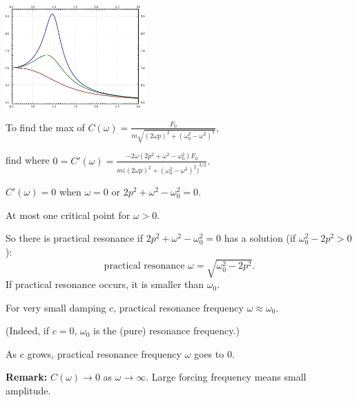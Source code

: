 \documentclass[10pt,aspectratio=169]{beamer}
\begin{document}
\begin{frame}

\hfill
\includegraphics[width=2.1in]{../figures/3-6-pracres}

\vspace*{-1.5in}
To find the max of
\quad
$\displaystyle
C(\omega) =
\frac{F_0}{m \sqrt{{(2\omega p)}^2+{(\omega_0^2-\omega^2)}^2}} ,
$

\medskip

find where
\quad
$\displaystyle
0 =
C'(\omega) =
\frac{- 2\omega( 2p^2+\omega^2-\omega_0^2)F_0}
{m {\bigl({(2\omega p)}^2+{(\omega_0^2-\omega^2)}^2\bigr)}^{3/2}} .
$

\medskip

$C'(\omega) = 0$ when
$\omega = 0$ or
$2p^2+\omega^2-\omega_0^2 = 0$.

\medskip
\pause

At most one critical point for $\omega > 0$.

\medskip
\pause

So there is practical resonance if $2p^2+\omega^2-\omega_0^2 = 0$
has a solution (if $\omega_0^2 - 2p^2 > 0$):
\[
\text{practical resonance }
\omega = \sqrt{\omega_0^2 - 2p^2} .
\]
\pause
If practical resonance occurs, it is smaller than $\omega_0$.

\pause
For very small damping $c$, practical resonance frequency $\omega \approx \omega_0$.

(Indeed, if $c=0$, $\omega_0$ is the (pure) resonance frequency.)

\pause
As $c$ grows, practical resonance frequency $\omega$ goes to $0$.

\medskip
\pause

\textbf{Remark:} $C(\omega) \to 0$ as
$\omega \to \infty$.
\quad\thus\quad
Large forcing frequency means small amplitude.
\end{frame}
\end{document}
